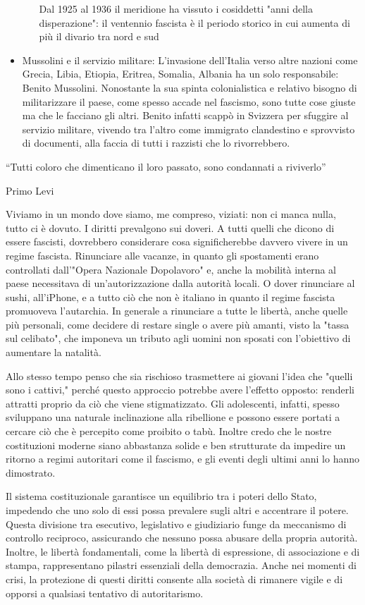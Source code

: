 \documentclass[12pt]{book} %
\begin{document}
\begin{mdframed}[linewidth=1pt]
\begin{itemize}
\begin{itemize}
Dal 1925 al 1936 il meridione ha vissuto i cosiddetti "anni della disperazione": il
ventennio fascista è il periodo storico in cui aumenta di più il divario tra nord e sud
\end{itemize}
\item Mussolini e il servizio militare: L'invasione dell'Italia verso altre
nazioni come Grecia, Libia, Etiopia, Eritrea, Somalia, Albania ha un solo responsabile: Benito Mussolini. Nonostante la
sua spinta colonialistica e relativo bisogno di militarizzare il paese, come spesso accade nel fascismo, sono tutte
cose giuste ma che le facciano gli altri. Benito infatti scappò in Svizzera per sfuggire al servizio militare, vivendo
tra l'altro come immigrato clandestino e sprovvisto di documenti, alla faccia di tutti i razzisti
che lo rivorrebbero.
\end{itemize}
“Tutti coloro che dimenticano il loro passato, sono condannati a riviverlo”

Primo Levi

Viviamo in un mondo dove siamo, me compreso, viziati: non ci manca nulla, tutto ci è dovuto. I diritti prevalgono sui doveri. A tutti quelli che dicono di essere fascisti, dovrebbero considerare cosa significherebbe davvero vivere in un regime fascista. Rinunciare alle vacanze, in quanto gli spostamenti erano controllati dall'"Opera Nazionale Dopolavoro" e, anche la mobilità interna al paese necessitava di un'autorizzazione dalla autorità locali. O dover rinunciare al sushi, all'iPhone, e a tutto ciò che non è italiano in quanto il regime fascista promuoveva l'autarchia. In generale a rinunciare a tutte le libertà, anche quelle più personali, come decidere di restare single o avere più amanti, visto la "tassa sul celibato", che imponeva un tributo agli uomini non sposati con l'obiettivo di aumentare la natalità.

Allo stesso tempo penso che sia rischioso trasmettere ai giovani l'idea che "quelli sono i cattivi," perché questo approccio potrebbe avere l’effetto opposto: renderli attratti proprio da ciò che viene stigmatizzato. Gli adolescenti, infatti, spesso sviluppano una naturale inclinazione alla ribellione e possono essere portati a cercare ciò che è percepito come proibito o tabù. Inoltre credo che le nostre costituzioni moderne siano abbastanza solide e ben strutturate da impedire un ritorno a regimi autoritari come il fascismo, e gli eventi degli ultimi anni lo hanno dimostrato.

Il sistema costituzionale garantisce un equilibrio tra i poteri dello Stato, impedendo che uno solo di essi possa prevalere sugli altri e accentrare il potere. Questa divisione tra esecutivo, legislativo e giudiziario funge da meccanismo di controllo reciproco, assicurando che nessuno possa abusare della propria autorità. Inoltre, le libertà fondamentali, come la libertà di espressione, di associazione e di stampa, rappresentano pilastri essenziali della democrazia. Anche nei momenti di crisi, la protezione di questi diritti consente alla società di rimanere vigile e di opporsi a qualsiasi tentativo di autoritarismo.


\end{mdframed}
\end{document}
